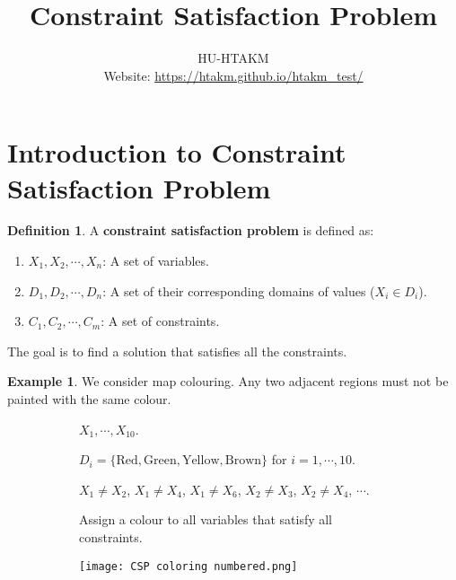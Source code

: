 \documentclass{article}
\title{
	\Huge Constraint Satisfaction Problem
}
\author{
	HU-HTAKM\\
	\small Website: \url{https://htakm.github.io/htakm_test/}
}
\theoremstyle{definition}
\newtheorem{definition}{Definition}[section]
\newtheorem{example}{Example}[definition]
\begin{document}
\maketitle
\section{Introduction to Constraint Satisfaction Problem}
\begin{definition}
	A \textbf{constraint satisfaction problem} is defined as:
	\begin{enumerate}
		\item $X_{1},X_{2},\cdots,X_{n}$: A set of variables.
		\item $D_{1},D_{2},\cdots,D_{n}$: A set of their corresponding domains of values ($X_{i}\in D_{i}$).
		\item $C_{1},C_{2},\cdots,C_{m}$: A set of constraints.
	\end{enumerate}
	The goal is to find a solution that satisfies all the constraints.
\end{definition}
\begin{example}
	\label{Map colouring problem}
	We consider map colouring. Any two adjacent regions must not be painted with the same colour.
	\begin{figure}[h]
		\begin{subfigure}[h]{0.64\textwidth}
			\begin{description}[style=nextline]
				\item[Variables:] $X_{1},\cdots,X_{10}$.
				\item[Domain:] $D_{i}=\{\text{Red},\text{Green},\text{Yellow},\text{Brown}\}$ for $i=1,\cdots,10$.
				\item[Constraint:] $X_{1}\neq X_{2}$, $X_{1}\neq X_{4}$, $X_{1}\neq X_{6}$, $X_{2}\neq X_{3}$, $X_{2}\neq X_{4}$, $\cdots$.
				\item[Goal:] Assign a colour to all variables that satisfy all constraints.
			\end{description}
		\end{subfigure}
		\begin{subfigure}[h]{0.35\textwidth}
			\texttt{[image: CSP coloring numbered.png]}
		\end{subfigure}
	\end{figure}
\end{example}
\end{document}
